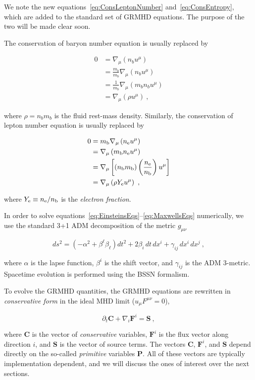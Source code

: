 \documentclass{article}
\newcommand{\primv}{\bm{P}}
\newcommand{\consv}{\bm{C}}
\newcommand{\fluxv}{\bm{F}}
\newcommand{\sourcev}{\bm{S}}
\newcommand{\ye}{Y_{\rm e}}
\renewcommand{\ne}{n_{\rm e}}
\newcommand{\nb}{n_{\rm b}}
\newcommand{\mb}{m_{\rm b}}
\newcommand{\eq}[1]{
\begin{equation}
    #1
\end{equation}
}
\newcommand{\spl}[1]{
\eq{
\begin{split}
    #1
\end{split}
}
}
\begin{document}
We note the new equations~\eqref{eq:ConsLeptonNumber} and~\eqref{eq:ConsEntropy}, which are added to the standard set of GRMHD equations. The purpose of the two will be made clear soon.

The conservation of baryon number equation is usually replaced by

\spl{
0 &= \nabla_{\mu}\left(n_{b}u^{\mu}\right)\\
  &= \frac{m_{b}}{m_{b}}\nabla_{\mu}\left(n_{b}u^{\mu}\right)\\
  &= \frac{1}{m_{b}}\nabla_{\mu}\left(m_{b}n_{b}u^{\mu}\right)\\
  &= \nabla_{\mu}\left(\rho u^{\mu}\right)\ ,
}

\noindent where $\rho = n_{b}m_{b}$ is the fluid rest-mass density. Similarly, the conservation of lepton number equation is usually replaced by

\spl{
0 &= \mb\nabla_{\mu}\left(\ne u^{\mu}\right)\\
  &= \nabla_{\mu}\left(\mb\ne u^{\mu}\right)\\
  &= \nabla_{\mu}\left[\left(\nb\mb\right)\left(\frac{\ne}{\nb}\right) u^{\mu}\right]\\
  &= \nabla_{\mu}\left(\rho\ye u^{\mu}\right)\ ,
}

\noindent where $\ye \equiv \ne/\nb$ is the \emph{electron fraction}.

In order to solve equations~\eqref{eq:EinsteinsEqs}--\eqref{eq:MaxwellsEqs} numerically, we use the standard 3+1 ADM decomposition of the metric $g_{\mu\nu}$

\eq{
ds^{2} = \left(-\alpha^{2}+\beta^{\ell}\beta_{\ell}\right)dt^{2}
       + 2\beta_{i}\,dt\, dx^{i}
       + \gamma_{ij}\,dx^{i}\,dx^{j}\ ,
}

\noindent where $\alpha$ is the lapse function, $\beta^{i}$ is the shift vector, and $\gamma_{ij}$ is the ADM 3-metric. Spacetime evolution is performed using the BSSN formalism.

To evolve the GRMHD quantities, the GRMHD equations are rewritten in \emph{conservative form} in the ideal MHD limit ($u_{\mu}F^{\mu\nu}=0$),

\eq{ \partial_{t}\consv + \nabla_{i}\fluxv^{i} = \sourcev\ , \label{eq:ConservEvol}}

\noindent where $\consv$ is the vector of \emph{conservative} variables, $\fluxv^{i}$ is the flux vector along direction $i$, and $\sourcev$ is the vector of source terms. The vectors $\consv$, $\fluxv^{i}$, and $\sourcev$ depend directly on the so-called \emph{primitive} variables $\primv$. All of these vectors are typically implementation dependent, and we will discuss the ones of interest over the next sections.
\end{document}
